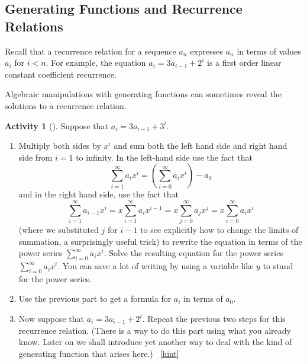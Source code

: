\documentclass[10pt,]{book}
\theoremstyle{plain}
\theoremstyle{definition}
\theoremstyle{definition}
\theoremstyle{definition}
\newtheorem{activity}[project]{Activity}
\numberwithin{equation}{chapter}
\newcommand{\lt}{<}
\begin{document}
\subsection[{Generating Functions and Recurrence Relations}]{Generating Functions and Recurrence Relations}\label{subsection-25}
\hypertarget{p-917}{}%
Recall that a recurrence relation for a sequence \(a_n\) expresses \(a_n\) in terms of values \(a_i\) for \(i\lt n\). For example, the equation \(a_i=3a_{i-1} +2^i\) is a first order linear constant coefficient recurrence.%
\par
\hypertarget{p-918}{}%
Algebraic manipulations with generating functions can sometimes reveal the solutions to a recurrence relation.%
\begin{activity}[]\label{substituteandsolve}
\hypertarget{p-919}{}%
Suppose that \(a_i=3a_{i-1} + 3^i\).%
\begin{enumerate}[font=\bfseries,label=(\alph*),ref=\alph*]
\item\label{task-175} \hypertarget{p-920}{}%
Multiply both sides by \(x^i\) and sum both the left hand side and right hand side from \(i=1\) to infinity.  In the left-hand side use the fact that%
\begin{equation*}
\sum_{i=1}^\infty a_ix^i = (\sum_{i=0}^\infty a_ix^i) - a_0
\end{equation*}
and in the right hand side, use the fact that%
\begin{equation*}
\sum_{i=1}^\infty a_{i-1}x^i = x\sum_{i=1}^\infty a_ix^{i-1}
=x\sum_{j=0}^\infty a_jx^j =x\sum_{i=0}^\infty a_ix^i
\end{equation*}
(where we substituted \(j\) for \(i-1\) to see explicitly how to change the limits of summation, a surprisingly useful trick) to rewrite the equation in terms of the power series \(\sum_{i=0}^\infty a_ix^i\).  Solve the resulting equation for the power series \(\sum_{i=0}^\infty a_ix^i\). You can save a lot of writing by using a variable like \(y\) to stand for the power series.%
\item\label{task-176} \hypertarget{p-922}{}%
Use the previous part to get a formula for \(a_i\) in terms of \(a_0\).%
\item\label{task-177} \hypertarget{p-924}{}%
Now suppose that \(a_i=3a_{i-1} + 2^i\).  Repeat the previous two steps for this recurrence relation.  (There is a way to do this part using what you already know.  Later on we shall introduce yet another way to deal with the kind of generating function that arises here.)%
~\hfill{\tiny\hyperlink{a-196.c}{[hint]}\hypertarget{q-196.c}{}}\end{enumerate}
\end{activity}
\end{document}
